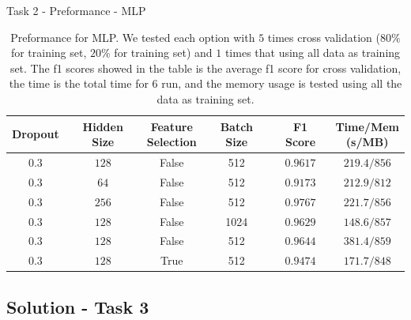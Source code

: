 \documentclass{beamer}
\begin{document}
\begin{frame}{Task 2 - Preformance - MLP}

  \begin{table}[H]
    \centering
    \begin{tabular}{|c|c|c|c|c|c|}
      \hline
      Dropout & Hidden Size & \makecell{Feature                                 \\ Selection} &Batch Size & F1 Score & \makecell{Time/Mem \\ (s/MB)} \\
      \hline
      $0.3$   & $128$       & False             & 512  & $0.9617$ & $219.4/856$ \\
      \hline
      $0.3$   & $64$        & False             & 512  & $0.9173$ & $212.9/812$ \\
      \hline
      $0.3$   & $256$       & False             & 512  & $0.9767$ & $221.7/856$ \\
      \hline
      $0.3$   & $128$       & False             & 1024 & $0.9629$ & $148.6/857$ \\
      \hline
      $0.3$   & $128$       & False             & 512  & $0.9644$ & $381.4/859$ \\
      \hline
      $0.3$   & $128$       & True              & 512  & $0.9474$ & $171.7/848$ \\
      \hline
    \end{tabular}
    \caption{Preformance for MLP. We tested each option with $5$ times cross validation ($80\%$ for training set, $20\%$ for training set) and $1$ times that using all data as training set. The f1 scores showed in the table is the average f1 score for cross validation, the time is the total time for $6$ run, and the memory usage is tested using all the data as training set.}
  \end{table}

\end{frame}

\subsection{Solution - Task 3}
\end{document}
